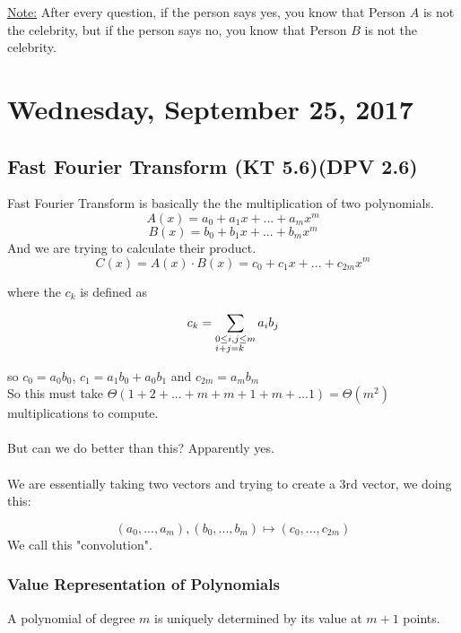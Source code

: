 \documentclass[12pt]{article}
\begin{document}
\begin{tcolorbox}
	\underline{Note:} After every question, if the person says yes, you know that Person $A$ is not the celebrity, but if the person says no, you know that Person $B$ is not the celebrity.
\end{tcolorbox}

\newpage

\section{Wednesday, September 25, 2017}

\subsection{Fast Fourier Transform (KT 5.6)(DPV 2.6)}

Fast Fourier Transform is basically the the multiplication of two polynomials.
$$A(x) = a_0 + a_1 x + ... + a_m x^m$$
$$B(x) = b_0 + b_1 x + ... + b_m x^m$$
And we are trying to calculate their product.
$$C(x) = A(x) \cdot B(x) = c_0 + c_1 x + ... + c_{2m} x^m$$

where the $c_k$ is defined as

$$c_k = \sum_{\begin{subarray}{l}
0 \leq i,j \leq m\\
i+j = k
\end{subarray}} a_i b_j$$

so $c_0 = a_0 b_0$, $c_1 = a_1 b_0 + a_0 b_1$ and $c_{2m} = a_m b_m$\\
So this must take $\Theta (1 + 2 + ... + m + m+1 + m + ... 1) = \Theta (m^2)$ multiplications to compute.\\
\\
But can we do better than this? Apparently yes.\\
\\
We are essentially taking two vectors and trying to create a 3rd vector, we doing this:

$$(a_0, ... , a_m), (b_0, ... , b_m) \mapsto (c_0, ... , c_{2m})$$
We call this "convolution".\\

\subsubsection{Value Representation of Polynomials}

\begin{tcolorbox}[title=Interpolation Theorem]
	A polynomial of degree $m$ is uniquely determined by its value at $m+1$ points.
\end{tcolorbox}
\end{document}

